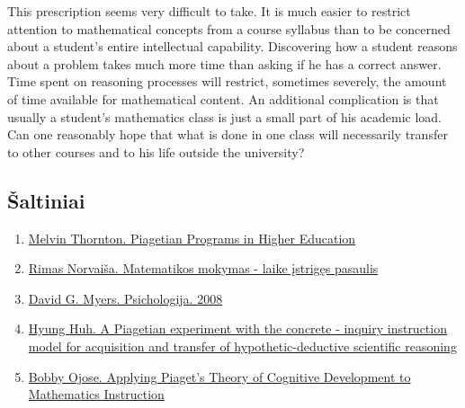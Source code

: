 \documentclass{article}
\begin{document}
 This prescription seems very difficult to take. It is much easier to restrict attention to
mathematical concepts from a course syllabus than to be concerned about a student's entire
intellectual capability. Discovering how a student reasons about a problem takes much more time
than asking if he has a correct answer. Time spent on reasoning processes will restrict,
sometimes severely, the amount of time available for mathematical content. An additional
complication is that usually a student's mathematics class is just a small part of his academic
load. Can one reasonably hope that what is done in one class will necessarily transfer to other
courses and to his life outside the university? 

\subsection{Šaltiniai}
\begin{enumerate}
\item \href{http://digitalcommons.unl.edu/cgi/viewcontent.cgi?article=1013\&context=adaptessays}{Melvin Thornton. Piagetian Programs in Higher Education}

\item \href{norvaisa.lt/wp-content/uploads/2012/07/laike-istriges-pasaulis.pdf}{Rimas Norvaiša. Matematikos mokymas - laike įstrigęs pasaulis}

\item \href{https://www.dropbox.com/s/vyghsx7k1ivd86g/David\%20G.\%20Myers\%20Psichologija\%202008.pdf?dl=0}{David G. Myers. Psichologija. 2008}

\item \href{https://pdfs.semanticscholar.org/3fbd/493c9bfa3d5a96bc2f82f8677b1de5b35b40.pdf\_ga=2.93207450.649401276.1573859970-917910527.1573859970}{Hyung Huh. A Piagetian experiment with the concrete - inquiry instruction model for acquisition and transfer of hypothetic-deductive scientific reasoning}

\item \href{https://files.eric.ed.gov/fulltext/EJ841568.pdf}{Bobby Ojose. Applying Piaget's Theory of Cognitive Development to Mathematics Instruction}
\end{enumerate}
\end{document}
